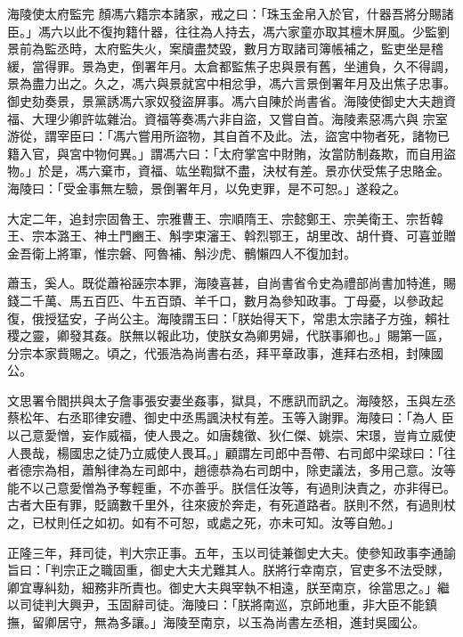 \begin{pinyinscope}
 海陵使太府監完
 顏馮六籍宗本諸家，戒之曰：「珠玉金帛入於官，什器吾將分賜諸臣。」馮六以此不復拘籍什器，往往為人持去，馮六家童亦取其檀木屏風。少監劉景前為監丞時，太府監失火，案牘盡焚毀，數月方取諸司簿帳補之，監吏坐是稽緩，當得罪。景為吏，倒署年月。太倉都監焦子忠與景有舊，坐逋負，久不得調，景為盡力出之。久之，馮六與景就宮中相忿爭，馮六言景倒署年月及出焦子忠事。御史劾奏景，景黨誘馮六家奴發盜屏事。馮六自陳於尚書省。海陵使御史大夫趙資福、大理少卿許竑雜治。資福等奏馮六非自盜，又嘗自首。海陵素惡馮六與
 宗室游從，謂宰臣曰：「馮六嘗用所盜物，其自首不及此。法，盜宮中物者死，諸物已籍入官，與宮中物何異。」謂馮六曰：「太府掌宮中財賄，汝當防制姦欺，而自用盜物。」於是，馮六棄市，資福、竑坐鞫獄不盡，決杖有差。景亦伏受焦子忠賂金。海陵曰：「受金事無左驗，景倒署年月，以免吏罪，是不可恕。」遂殺之。



 大定二年，追封宗固魯王、宗雅曹王、宗順隋王、宗懿鄭王、宗美衛王、宗哲韓王、宗本潞王、神土門豳王、斛孛束瀋王、斡烈鄂王，胡里改、胡什賚、可喜並贈金吾衛上將軍，惟宗磐、阿魯補、斛沙虎、鶻懶四人不復加封。



 蕭玉，奚人。既從蕭裕誣宗本罪，海陵喜甚，自尚書省令史為禮部尚書加特進，賜錢二千萬、馬五百匹、牛五百頭、羊千口，數月為參知政事。丁母憂，以參政起復，俄授猛安，子尚公主。海陵謂玉曰：「朕始得天下，常患太宗諸子方強，賴社稷之靈，卿發其姦。朕無以報此功，使朕女為卿男婦，代朕事卿也。」賜第一區，分宗本家貲賜之。頃之，代張浩為尚書右丞，拜平章政事，進拜右丞相，封陳國公。



 文思署令閻拱與太子詹事張安妻坐姦事，獄具，不應訊而訊之。海陵怒，玉與左丞蔡松年、右丞耶律安禮、御史中丞馬諷決杖有差。玉等入謝罪。海陵曰：「為人
 臣以己意愛憎，妄作威福，使人畏之。如唐魏徵、狄仁傑、姚崇、宋璟，豈肯立威使人畏哉，楊國忠之徒乃立威使人畏耳。」顧謂左司郎中吾帶、右司郎中梁球曰：「往者德宗為相，蕭斛律為左司郎中，趙德恭為右司朗中，除吏議法，多用己意。汝等能不以己意愛憎為予奪輕重，不亦善乎。朕信任汝等，有過則決責之，亦非得已。古者大臣有罪，貶謫數千里外，往來疲於奔走，有死道路者。朕則不然，有過則杖之，已杖則任之如初。如有不可恕，或處之死，亦未可知。汝等自勉。」



 正隆三年，拜司徒，判大宗正事。五年，玉以司徒兼御史大夫。使參知政事李通諭
 旨曰：「判宗正之職固重，御史大夫尤難其人。朕將行幸南京，官吏多不法受賕，卿宜專糾劾，細務非所責也。御史大夫與宰執不相遠，朕至南京，徐當思之。」繼以司徒判大興尹，玉固辭司徒。海陵曰：「朕將南巡，京師地重，非大臣不能鎮撫，留卿居守，無為多讓。」海陵至南京，以玉為尚書左丞相，進封吳國公。




\end{pinyinscope}
